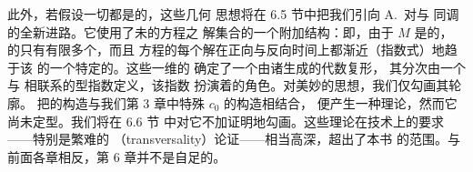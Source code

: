 此外，若假设一切\trForcedOscillation{}都是\trNondegenerate{}的，这些几何%
思想将在 6.5 节中把我们引向 A.~\trFloer{}对\trMorseTheory{}与\trFloer{}%
同调的全新进路。它使用了未\trRegularization{}的\trGradient{}方程之%
\trBounded{}解集合的一个附加结构：即，由于 $M$ 是\trCompact{}的，%
\trNondegenerate{}的\trForcedOscillation{}只有有限多个，而且\trGradient{}%
方程的每个\trBounded{}解在正向与反向时间上都渐近（指数式）地趋于该%
\trHamiltonianSystem{}的一个特定的\trForcedOscillation。这些一维的%
\trConnectingOrbit{}确定了一个由诸\trForcedOscillation{}生成的代数复形，%
其分次由一个与%
\trNondegenerate\trForcedOscillation{}相联系的\trMaslov{}型指数定义，该指数%
扮演着\trMorseIndex{}的角色。对\trFloer{}美妙的思想，我们仅勾画其轮廓。%
把\trFloer{}的构造与我们第 3 章中特殊\trCapacity{} $c_{0}$ 的构造相结合，%
便产生一种\trSymplectic\trHomology{}理论，然而它尚未定型。我们将在 6.6 节%
中对它不加证明地勾画。这些理论在技术上的要求——特别是繁难的%
\textbf{\trTransversality}（transversality）论证——相当高深，超出了本书%
的范围。与前面各章相反，第 6 章并不是自足的。
